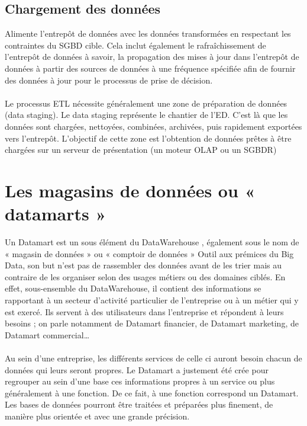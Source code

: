 \subsection{Chargement des données}
Alimente l’entrepôt de données avec les données transformées en respectant les contraintes du SGBD cible. Cela inclut également le rafraîchissement de l’entrepôt de données à savoir, la propagation des mises à jour dans l’entrepôt de données à partir des sources de données à une fréquence spécifiée afin de fournir des données à jour pour le processus de prise de décision. \cite{book:10}

\paragraph{}
Le processus ETL nécessite généralement une zone de préparation de données (data staging). Le data staging représente le chantier de l’ED. C’est là que les données sont chargées, nettoyées, combinées, archivées, puis rapidement exportées vers l’entrepôt. L’objectif de cette zone est l’obtention de données prêtes à être chargées sur un serveur de présentation (un moteur OLAP ou un SGBDR) \cite{book:12}



\section{Les magasins de données ou « datamarts »}
Un Datamart est un sous élément du DataWarehouse , également sous le nom de « magasin de données » ou « comptoir de données » Outil aux prémices du Big Data, son but n’est pas de rassembler des données avant de les trier mais au contraire de les organiser selon des usages métiers ou des domaines ciblés. En effet, sous-ensemble du DataWarehouse, il contient des informations se rapportant à un secteur d'activité particulier de l'entreprise ou à un métier qui y est exercé. Ils servent à des utilisateurs dans l’entreprise et répondent à leurs besoins ; on parle notamment de Datamart financier, de Datamart marketing, de Datamart commercial…
\paragraph{}
Au sein d’une entreprise, les différents services de celle ci auront besoin chacun de données qui leurs seront propres. Le Datamart a justement été crée pour regrouper au sein d’une base ces informations propres à un service ou plus généralement à une fonction. De ce fait, à une fonction correspond un Datamart. Les bases de données pourront être traitées et préparées plus finement, de manière plus orientée et avec une grande précision.
